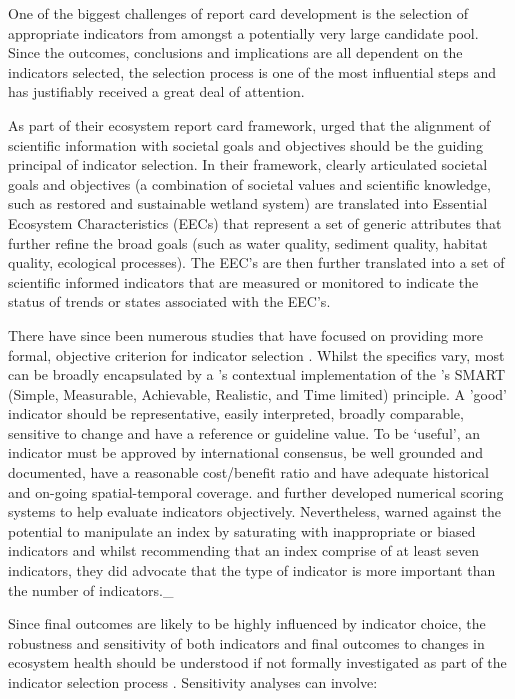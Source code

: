 \documentclass[a4paper]{AIMSreport}
\begin{document}
One of the biggest challenges of report card development is the selection of appropriate indicators
from amongst a potentially very large candidate pool.  Since the outcomes, conclusions and
implications are all dependent on the indicators selected, the selection process is one of the most
influential steps and has justifiably received a great deal of attention.

As part of their ecosystem report card framework, \citet{Harwell-1999} urged that the alignment of
scientific information with societal goals and objectives should be the guiding principal of
indicator selection.  In their framework, clearly articulated societal goals and objectives (a
combination of societal values and scientific knowledge, such as restored and sustainable wetland
system) are translated into Essential Ecosystem Characteristics (EECs) that represent a set of
generic attributes that further refine the broad goals (such as water quality, sediment quality,
habitat quality, ecological processes).  The EEC's are then further translated into a set of
scientific informed indicators that are measured or monitored to indicate the status of trends or
states associated with the EEC's.
  
There have since been numerous studies that have focused on providing more formal, objective
criterion for indicator selection \citep{Dauvin-2008, Emerson-2012, Flint-2012, James-2012}.  Whilst
the specifics vary, most can be broadly encapsulated by a \citet{Dauvin-2008}'s contextual
implementation of the \citet{Doran-1981}'s SMART (Simple, Measurable, Achievable, Realistic, and
Time limited) principle.  A 'good' indicator should be representative, easily interpreted, broadly
comparable, sensitive to change and have a reference or guideline value.  To be `useful', an
indicator must be approved by international consensus, be well grounded and documented, have a
reasonable cost/benefit ratio and have adequate historical and on-going spatial-temporal coverage.
\citet{Flint-2012} and \citet{James-2012} further developed numerical scoring systems to help
evaluate indicators objectively.  Nevertheless, \citep{Neary-2012} warned against the potential to
manipulate an index by saturating with inappropriate or biased indicators and whilst recommending
that an index comprise of at least seven indicators, they did advocate that the type of indicator is
more important than the number of indicators._

Since final outcomes are likely to be highly influenced by indicator choice, the robustness and
sensitivity of both indicators and final outcomes to changes in ecosystem health should be
understood if not formally investigated as part of the indicator selection process
\citep{Dobbie-2013}.  Sensitivity analyses can involve:
\end{document}
